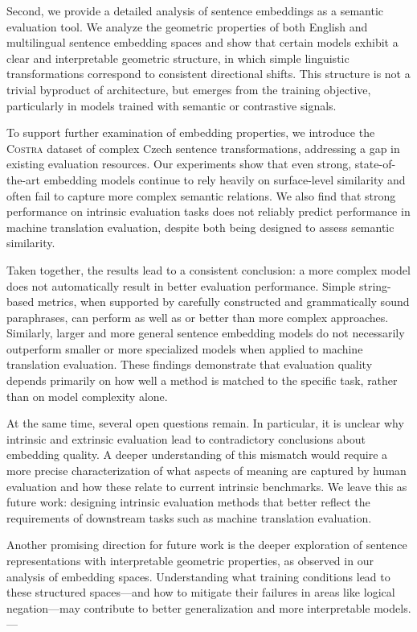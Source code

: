 \documentclass[12pt,a4paper]{report}
\newcommand{\costra}{\textsc{Costra}\xspace}
\begin{document}
Second, we provide a detailed analysis of sentence embeddings as a semantic evaluation tool. We analyze the geometric properties of both English and multilingual sentence embedding spaces and show that certain models exhibit a clear and interpretable geometric structure, in which simple linguistic transformations correspond to consistent directional shifts. This structure is not a trivial byproduct of architecture, but emerges from the training objective, particularly in models trained with semantic or contrastive signals.

To support further examination of embedding properties, we introduce the \costra dataset of complex Czech sentence transformations, addressing a gap in existing evaluation resources. Our experiments show that even strong, state-of-the-art embedding models continue to rely heavily on surface-level similarity and often fail to capture more complex semantic relations. We also find that strong performance on intrinsic evaluation tasks does not reliably predict performance in machine translation evaluation, despite both being designed to assess semantic similarity.

Taken together, the results lead to a consistent conclusion: a more complex model does not automatically result in better evaluation performance. Simple string-based metrics, when supported by carefully constructed and grammatically sound paraphrases, can perform as well as or better than more complex approaches. Similarly, larger and more general sentence embedding models do not necessarily outperform smaller or more specialized models when applied to machine translation evaluation. These findings demonstrate that evaluation quality depends primarily on how well a method is matched to the specific task, rather than on model complexity alone.

At the same time, several open questions remain. In particular, it is unclear why intrinsic and extrinsic evaluation lead to contradictory conclusions about embedding quality. A deeper understanding of this mismatch would require a more precise characterization of what aspects of meaning are captured by human evaluation and how these relate to current intrinsic benchmarks. We leave this as future work: designing intrinsic evaluation methods that better reflect the requirements of downstream tasks such as machine translation evaluation.

Another promising direction for future work is the deeper exploration of sentence representations with interpretable geometric properties, as observed in our analysis of embedding spaces. Understanding what training conditions lead to these structured spaces---and how to mitigate their failures in areas like logical negation---may contribute to better generalization and more interpretable models.
---
\end{document}
